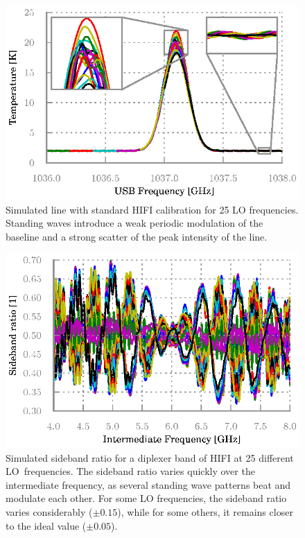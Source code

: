 \documentclass[journal]{IEEEtran}
\begin{document}
\begin{figure}
    \centering
    \includegraphics[width=\columnwidth]{bb-on_corrected-2}
    \caption{Simulated line with standard HIFI calibration for 25 LO frequencies.
    Standing waves introduce a weak periodic modulation of the baseline and a strong scatter of the peak intensity of the line.}%
    \label{fig:calibrated_std}
\end{figure}

\begin{figure}
    \centering
    \includegraphics[width=\columnwidth]{sbr}
    \caption{Simulated sideband ratio for a diplexer band of HIFI at 25 different LO~frequencies.
    The sideband ratio varies quickly over the intermediate frequency, as several standing wave patterns beat and modulate each other.
    For some LO frequencies, the sideband ratio varies considerably ($\pm 0.15$), while for some others, it remains closer to the ideal value ($\pm 0.05$).}%
    \label{fig:sbr}
\end{figure}
\end{document}
